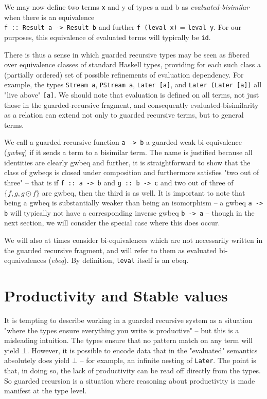 \documentclass[hoptionsi,review,format=sigplan]{acmart}
\newcommand{\hs}{\texttt}
\begin{document}
We may now define two terms \hs{x} and {y} of types {a} and {b} as \emph{evaluated-bisimilar}  when there is an equivalence \\ \hs{f :: Result a -> Result b} and further \hs{f (leval x)} = \hs{leval y}. For our purposes, this equivalence of evaluated terms will typically be \hs{id}. 

There is thus a sense in which guarded recursive types may be seen as fibered over equivalence classes of standard Haskell types, providing for each such class a (partially ordered) set of possible refinements of evaluation dependency. For example, the types \hs{Stream a}, \hs{PStream a}, \hs{Later [a]}, and \hs{Later (Later [a])} all "live above" \hs{[a]}. We should note that evaluation is defined on all terms, not just those in the guarded-recursive fragment, and consequently evaluated-bisimilarity as a relation can extend not only to guarded recursive terms, but to general terms.

We call a guarded recursive function \hs{a -> b} a guarded weak bi-equivalence (\emph{gwbeq}) if it sends a term to a bisimilar term. The name is justified because all identities are clearly gwbeq and further, it is straightforward to show that the class of gwbeqs is closed under composition and furthermore satisfies "two out of three" -- that is if  \hs{f :: a -> b} and \hs{g :: b -> c} and two out of three of $\{f, g, g \odot f\}$ are gwbeq, then the third is as well. It is important to note that being a gwbeq is substantially weaker than being an isomorphism -- a gwbeq \hs{a -> b} will typically not have a corresponding inverse gwbeq \hs{b -> a} -- though in the next section, we will consider the special case where this does occur.
 
We will also at times consider bi-equivalences which are not necessarily written in the guarded recursive fragment, and will refer to them as evaluated bi-equaivalences (\emph{ebeq}). By definition, \hs{leval} itself is an ebeq.

\section{Productivity and Stable values}
It is tempting to describe working in a guarded recursive system as a situation "where the types ensure everything you write is productive" -- but this is a misleading intuition. The types ensure that no pattern match on any term will yield $\bot$. However, it is possible to encode data that in the "evaluated" semantics absolutely does yield $\bot$ -- for example, an infinite nesting of \hs{Later}. The point is that, in doing so, the lack of productivity can be read off directly from the types. So guarded recursion is a situation where reasoning about productivity is made manifest at the type level.
\end{document}
